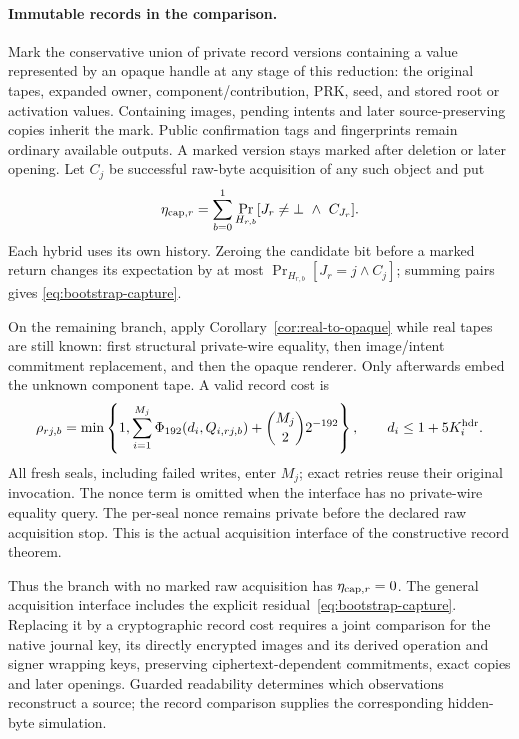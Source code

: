 \documentclass[pdflatex]{sn-jnl}
\theoremstyle{thmstyleone}
\theoremstyle{thmstylethree}
\theoremstyle{thmstyletwo}
\begin{document}
\paragraph{Immutable records in the comparison.}
Mark the conservative union of private record versions containing a
value represented by an opaque handle at any stage of this reduction:
the original tapes, expanded owner, component/contribution, PRK, seed,
and stored root or activation values. Containing images, pending
intents and later source-preserving copies inherit the mark. Public
confirmation tags and fingerprints remain ordinary available outputs.
A marked version stays marked after deletion or later opening.
Let $C_j$ be successful raw-byte acquisition of any such object and put
\begin{equation}
 \eta_{{\rm cap},r}=\sum_{b=0}^{1}
      \Pr_{H_{r,b}}[J_r\ne\bot\ \land\ C_{J_r}].
 \label{eq:bootstrap-capture}
\end{equation}
Each hybrid uses its own history. Zeroing the candidate bit before a
marked return changes its expectation by at most
$\Pr_{H_{r,b}}[J_r=j\land C_j]$; summing pairs gives
\eqref{eq:bootstrap-capture}.

On the remaining branch, apply Corollary~\ref{cor:real-to-opaque}
while real tapes are still known: first structural private-wire equality,
then image/intent commitment replacement, and then the opaque renderer.
Only afterwards embed the unknown component tape. A valid record cost is
\[
 \rho_{rj,b}=\min\left\{1,
   \sum_{i=1}^{M_j}\Phi_{192}(d_i,Q_{i,rj,b})
                  +\binom{M_j}{2}2^{-192}\right\},
 \qquad d_i\le1+5K_i^{\rm hdr}.
\]
All fresh seals, including failed writes, enter $M_j$; exact retries
reuse their original invocation. The nonce term is omitted when the
interface has no private-wire equality query. The per-seal nonce remains
private before the declared raw acquisition stop. This is the actual
acquisition interface of the constructive record theorem.

Thus the branch with no marked raw acquisition has
$\eta_{{\rm cap},r}=0$. The general acquisition interface includes the
explicit residual~\eqref{eq:bootstrap-capture}. Replacing it by a
cryptographic record cost requires a joint comparison for the native
journal key, its directly encrypted images and its derived operation
and signer wrapping keys, preserving ciphertext-dependent commitments,
exact copies and later openings. Guarded readability determines which
observations reconstruct a source; the record comparison supplies the
corresponding hidden-byte simulation.
\end{document}
